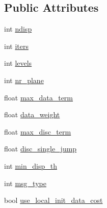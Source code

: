 \subsection*{Public Attributes}
\begin{DoxyCompactItemize}
\item 
int \hyperlink{classcv_1_1gpu_1_1StereoConstantSpaceBP_ad581f8f942bce3c65131ef5db9051dd3}{ndisp}
\item 
int \hyperlink{classcv_1_1gpu_1_1StereoConstantSpaceBP_a259939bb24dd2f1de48e718e9b7d4f5e}{iters}
\item 
int \hyperlink{classcv_1_1gpu_1_1StereoConstantSpaceBP_a343113cd7fac638c7bbdb0e8854e4416}{levels}
\item 
int \hyperlink{classcv_1_1gpu_1_1StereoConstantSpaceBP_a75c85050ba1c024997ff44dcd05593e4}{nr\-\_\-plane}
\item 
float \hyperlink{classcv_1_1gpu_1_1StereoConstantSpaceBP_a57d8b29ef9d9f496fdcfdbb82f27b2e9}{max\-\_\-data\-\_\-term}
\item 
float \hyperlink{classcv_1_1gpu_1_1StereoConstantSpaceBP_aa6a65a63755315c42fc9f3db17c04fc7}{data\-\_\-weight}
\item 
float \hyperlink{classcv_1_1gpu_1_1StereoConstantSpaceBP_af39f878f966eace5a27b54ae518b17ec}{max\-\_\-disc\-\_\-term}
\item 
float \hyperlink{classcv_1_1gpu_1_1StereoConstantSpaceBP_a98d239cda5f01d67be1086318f8a37ce}{disc\-\_\-single\-\_\-jump}
\item 
int \hyperlink{classcv_1_1gpu_1_1StereoConstantSpaceBP_ada95c36baf3e7f59ecbadcb34ef3f609}{min\-\_\-disp\-\_\-th}
\item 
int \hyperlink{classcv_1_1gpu_1_1StereoConstantSpaceBP_aeba70bf4f20c6e7cbcaae764d7c30b24}{msg\-\_\-type}
\item 
bool \hyperlink{classcv_1_1gpu_1_1StereoConstantSpaceBP_adb71b7b7cdc36ff4ee1535dc0abd4d73}{use\-\_\-local\-\_\-init\-\_\-data\-\_\-cost}
\end{DoxyCompactItemize}


